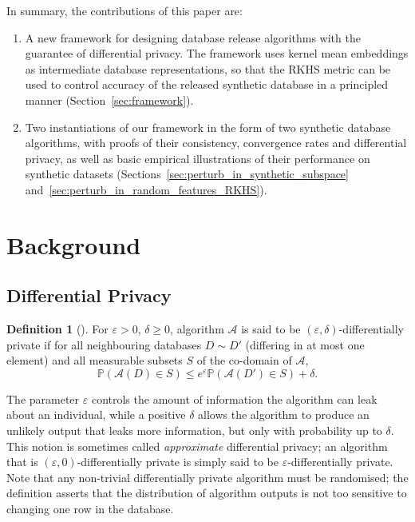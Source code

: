 \documentclass{article}
\newcommand{\calA}{\mathcal{A}}			%
\newcommand{\IP}{\mathbb{P}}  			%
\theoremstyle{plain}
\theoremstyle{remark}
\theoremstyle{definition}
\newtheorem{definition}[theorem]{Definition}
\begin{document}
In summary, the contributions of this paper are:
\begin{enumerate}
	\item A new framework for designing database release algorithms with the guarantee of differential privacy. The framework uses kernel mean embeddings as intermediate database representations, so that the RKHS metric can be used to control accuracy of the released synthetic database in a principled manner (Section~\ref{sec:framework}).
	\item Two instantiations of our framework in the form of two synthetic database algorithms, with proofs of their consistency, convergence rates and differential privacy, as well as basic empirical illustrations of their performance on synthetic datasets (Sections~\ref{sec:perturb_in_synthetic_subspace} and~\ref{sec:perturb_in_random_features_RKHS}).
\end{enumerate}



\section{Background}
\label{sec:background}


\subsection{Differential Privacy}
\label{sec:background:differential_privacy}

\begin{definition}[\citealp{dwork_differential_2006}]
	For $\varepsilon > 0$, $\delta \geq 0$, algorithm $\calA$ is said to be $(\varepsilon, \delta)$-differentially private if for all neighbouring databases $D \sim D'$ (differing in at most one element) and all measurable subsets $S$ of the co-domain of $\calA$,
	\begin{equation}
	\IP\left( \calA(D) \in S \right)
	\leq e^{\varepsilon} \IP\left( \calA(D') \in S \right) + \delta
	.
	\end{equation}
\end{definition}

The parameter $\varepsilon$ controls the amount of information the algorithm can leak about an individual, while a positive $\delta$ allows the algorithm to produce an unlikely output that leaks more information, but only with probability up to $\delta$. This notion is sometimes called \emph{approximate} differential privacy; an algorithm that is $(\varepsilon, 0)$-differentially private is simply said to be $\varepsilon$-differentially private. Note that any non-trivial differentially private algorithm must be randomised; the definition asserts that the distribution of algorithm outputs is not too sensitive to changing one row in the database.
\end{document}
